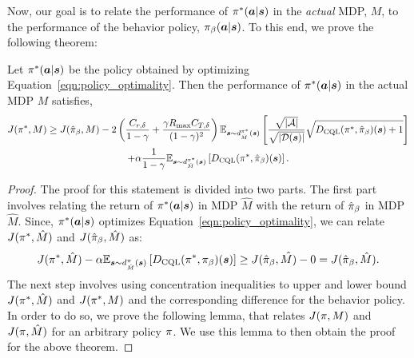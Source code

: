 Now, our goal is to relate the performance of $\pi^*(\boldsymbol{a}|\boldsymbol{s})$ in the \emph{actual} MDP, $M$, to the performance of the behavior policy, ${\pi_\beta}(\boldsymbol{a}|\boldsymbol{s})$. To this end, we prove the following theorem:
\begin{theorem}
\label{thm:zeta_safe_app}
Let $\pi^*(\boldsymbol{a}|\boldsymbol{s})$ be the policy obtained by optimizing Equation~\ref{eqn:policy_optimality}. Then the performance of $\pi^*(\boldsymbol{a}|\boldsymbol{s})$ in the actual MDP $M$ satisfies,
\begin{multline}
    \label{eqn:performance_relation}
    J(\pi^*, M) \geq J(\hat{\pi}_\beta, M) - 2\left({\frac{C_{r, \delta}}{1 - \gamma} + \frac{\gamma R_{\max} C_{T, \delta}}{(1 - \gamma)^2}} \right)\mathbb{E}_{\boldsymbol{s} \sim d^{\pi^*}_{\hat{M}}(\boldsymbol{s})}\left[ \frac{\sqrt{|\mathcal{A}|}}{\sqrt{|\mathcal{D}(\boldsymbol{s})|}} \sqrt{ D_{\text{CQL}}(\pi^*, \hat{\pi}_\beta)(\boldsymbol{s}) + 1} \right] \\
    + \alpha \frac{1}{1 - \gamma} \mathbb{E}_{\boldsymbol{s} \sim d^{\pi^*}_{\hat{M}}(\boldsymbol{s})}\left[D_{\text{CQL}}(\pi^*, \hat{\pi}_\beta)(\boldsymbol{s}) \right].
\end{multline}
\end{theorem}
\begin{proof}
The proof for this statement is divided into two parts. The first part involves relating the return of $\pi^*(\boldsymbol{a}|\boldsymbol{s})$ in MDP $\hat{M}$ with the return of $\hat{\pi}_\beta$ in MDP $\hat{M}$. Since, $\pi^*(\boldsymbol{a}|\boldsymbol{s})$ optimizes Equation~\ref{eqn:policy_optimality}, we can relate $J(\pi^*, \hat{M})$ and $J(\hat{\pi}_\beta, \hat{M})$ as:
\begin{equation*}
    J(\pi^*, \hat{M}) - \alpha \mathbb{E}_{\boldsymbol{s} \sim d^\pi_{\hat{M}}(\boldsymbol{s})}\left[D_{\text{CQL}}(\pi^*, {\pi_\beta})(\boldsymbol{s}) \right] \geq J(\hat{\pi}_\beta, \hat{M)} - 0 = J(\hat{\pi}_\beta, \hat{M}).
\end{equation*}
The next step involves using concentration inequalities to upper and lower bound $J(\pi^*, \hat{M})$ and $J(\pi^*, M)$ and the corresponding difference for the behavior policy. In order to do so, we prove the following lemma, that relates $J(\pi, M)$ and $J(\pi, \hat{M})$ for an arbitrary policy $\pi$. We use this lemma to then obtain the proof for the above theorem.
\end{proof}

